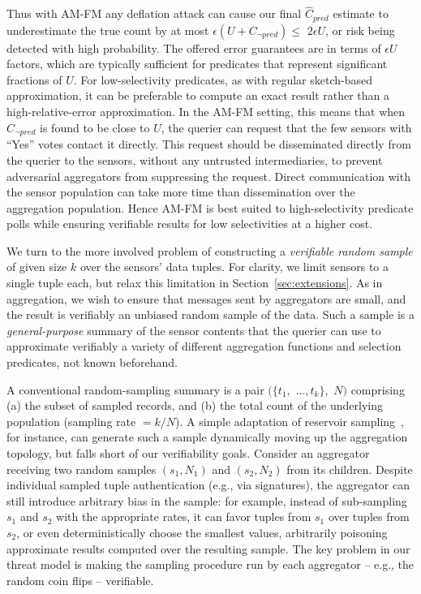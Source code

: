 \documentclass[10pt,twocolumn]{article}
\newcommand{\amfm}{AM-FM\xspace}
\newcommand{\cnpred}{\ensuremath{C_{\neg\mathit{pred}}}\xspace}
\newcommand{\estcpred}{\ensuremath{\hat{C}_\mathit{pred}}\xspace}
\newcommand{\estcnpred}{\ensuremath{\hat{C}_{\neg\mathit{pred}}}\xspace}
\begin{document}
Thus with \amfm any
deflation attack can cause our final $\estcpred$ estimate
to underestimate the true count by at most
$\epsilon(U+\cnpred)\leq$ $2\epsilon U$, 
or risk being detected with high probability. 
The offered error guarantees are in terms of 
$\epsilon U$ factors, which are typically sufficient for predicates that 
represent significant fractions of $U$.
For low-selectivity predicates, as with regular sketch-based
approximation, it can be preferable to compute an exact result rather
than a high-relative-error approximation.  In the \amfm setting, this
means that when \estcnpred is found to be close to $U$, the querier
can request that the few sensors with ``Yes'' votes contact it
directly.  This request should be disseminated directly from the
querier to the sensors, without any untrusted intermediaries, to
prevent adversarial aggregators from suppressing the request.  Direct
communication with the sensor population can take more time than
dissemination over the aggregation population.  Hence \amfm is best
suited to high-selectivity predicate polls while ensuring
verifiable results for low selectivities at a higher cost.











\label{sec:distinctSample}
\vspace{-1em}

We turn to the more involved problem of constructing a
\emph{verifiable random sample} of given size $k$ over the sensors' data
tuples.  For clarity, we limit sensors to a
single tuple each, 
but relax this limitation in Section~\ref{sec:extensions}.
As in aggregation, we wish
to ensure that messages sent by
aggregators are small, and the result is verifiably
an unbiased random sample of the data.  Such a sample
is a \emph{general-purpose} summary of the sensor contents
that the querier can use to approximate verifiably a variety of different aggregation
functions and selection
predicates, not known beforehand.


A conventional random-sampling summary is a pair 
$(\{t_1, $ $\ldots, t_k\},$ $N)$ comprising (a) the subset of sampled 
records, and (b) the total count of the underlying population (sampling
rate $= k/N$). 
A simple adaptation of reservoir 
sampling~\cite{Vitter1985}, for instance, can generate such a sample
dynamically moving up the aggregation topology, but falls
short of our verifiability goals.  Consider an aggregator receiving two 
random samples $(s_1, N_1)$ and $(s_2, N_2)$ from its children.
Despite individual sampled tuple authentication (e.g., via signatures), the 
aggregator can still introduce arbitrary bias in the sample: for
example, instead of sub-sampling $s_1$ and $s_2$ with the appropriate
rates, it can favor tuples from $s_1$ over tuples from $s_2$, or even
deterministically choose the smallest values, arbitrarily poisoning 
approximate results computed over the resulting sample.  The key
problem in our threat model is making the sampling procedure run by each
aggregator -- e.g., the random coin flips -- verifiable.
\end{document}
